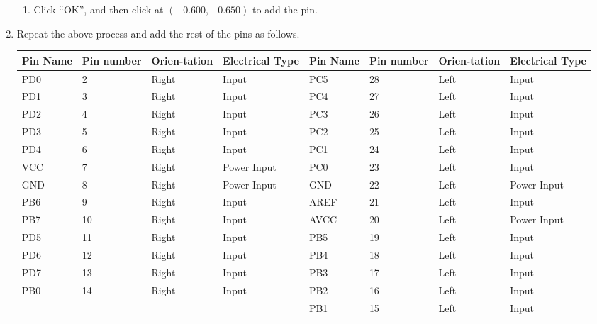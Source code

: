 \documentclass[12pt,letterpaper]{scrartcl}
\begin{document}
\begin{enumerate}
\begin{enumerate}
			\item Click ``OK'', and then click at $(-0.600, -0.650)$ to add the pin. 
		\end{enumerate}

	\item Repeat the above process and add the rest of the pins as follows. 
		\begin{table}[hp]
			\centering
			\begin{tabular}{|p{0.5in}|p{0.5in}|p{0.5in}|p{1in}||p{0.5in}|p{0.5in}|p{0.5in}|p{1in}|}
				\hline  \textbf{Pin Name} & \textbf{Pin number} & \textbf{Orien-tation} & \textbf{Electrical Type} & \textbf{Pin Name} & \textbf{Pin number} & \textbf{Orien-tation} & \textbf{Electrical Type}\\ 
				\hline \hline PD0 & 2 & Right & Input & PC5 & 28 & Left & Input\\ 
				\hline PD1 & 3 & Right & Input & PC4 & 27 & Left & Input\\ 
				\hline PD2 & 4 & Right & Input & PC3 & 26 & Left & Input \\ 
				\hline PD3 & 5 & Right & Input & PC2 & 25 & Left & Input\\ 
				\hline PD4 & 6 & Right & Input & PC1 & 24 & Left & Input\\ 
				\hline VCC & 7 & Right & Power Input & PC0 & 23 & Left & Input\\ 
				\hline GND & 8 & Right & Power Input & GND & 22 & Left & Power Input\\ 
				\hline PB6 & 9 & Right & Input & AREF & 21 & Left & Input\\ 
				\hline PB7 & 10 & Right & Input & AVCC & 20 & Left & Power Input\\ 
				\hline PD5 & 11 & Right & Input & PB5 & 19 & Left & Input\\ 
				\hline PD6 & 12 & Right & Input & PB4 & 18 & Left & Input\\ 
				\hline PD7 & 13 & Right & Input & PB3 & 17 & Left & Input\\ 
				\hline PB0 & 14 & Right & Input & PB2 & 16 & Left & Input\\ 
				\hline & & & & PB1 & 15 & Left & Input\\
				\hline 
			\end{tabular} 
		\end{table}
	

\end{enumerate}
\end{document}
